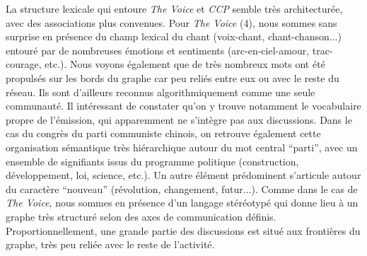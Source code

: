 \begin{figure}
    \centering
    
  \caption{
  }
\end{figure}

La structure lexicale qui entoure \textit{The Voice }et \textit{CCP
}semble tr\`es architectur\'ee, avec des associations plus convenues.
Pour \textit{The Voice }(4)\textit{, }nous sommes sans surprise en
pr\'esence du champ lexical du chant (voix-chant, chant-chanson...)
entour\'e par de nombreuses \'emotions et sentiments
(arc-en-ciel-amour, trac-courage, etc.). Nous voyons \'egalement que de
tr\`es nombreux mots ont \'et\'e propuls\'es sur les bords du graphe
car peu reli\'es entre eux ou avec le reste du r\'eseau. Ils sont
d{\textquoteright}ailleurs reconnus algorithmiquement comme une seule
communaut\'e. Il int\'eressant de constater qu{\textquoteright}on y
trouve notamment le vocabulaire propre de l{\textquoteright}\'emission,
qui apparemment ne s{\textquoteright}int\`egre pas aux discussions.
Dans le cas du congr\`es du parti communiste chinois, on retrouve
\'egalement cette organisation s\'emantique tr\`es hi\'erarchique
autour du mot central {\textquotedblleft}parti{\textquotedblright},
avec un ensemble de signifiants issus du programme politique
(construction, d\'eveloppement, loi, science, etc.). Un autre
\'el\'ement pr\'edominent s{\textquoteright}articule autour du
caract\`ere {\textquotedblleft}nouveau{\textquotedblright}
(r\'evolution, changement, futur...). Comme dans le cas de \textit{The
Voice}, nous sommes en pr\'esence d{\textquoteright}un langage
st\'er\'eotyp\'e qui donne lieu \`a un graphe tr\`es structur\'e selon
des axes de communication d\'efinis. Proportionnellement, une grande
partie des discussions est situ\'e aux fronti\`eres du graphe, tr\`es
peu reli\'ee avec le reste de l{\textquoteright}activit\'e.

